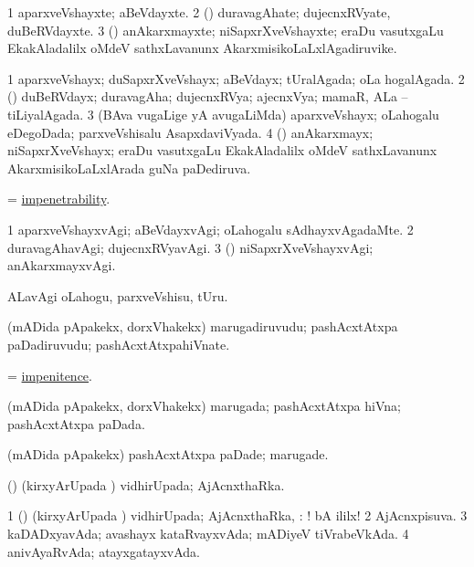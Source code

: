 \bentry
{}
\gl{\nA}
\bmng
\bnum
\num{1} aparxveVshayxte; aBeVdayxte. 
\num{2} (\rUpa) duravagAhate; dujecnxRVyate, duBeRVdayxte. 
\num{3} (\Bwvi) anAkarxmayxte; niSapxrXveVshayxte; eraDu vasutxgaLu EkakAladalilx oMdeV sathxLavanunx AkarxmisikoLaLxlAgadiruvike. 
\enum
\emng
\eentry

\bentry
{}
\gl{\gu}
\bmng
\bnum
\num{1} aparxveVshayx; duSapxrXveVshayx; aBeVdayx; tUralAgada; oLa hogalAgada. 
\num{2} (\rUpa) duBeRVdayx; duravagAha; dujecnxRVya; ajecnxVya; mamaR, ALa -- tiLiyalAgada. 
\num{3} (BAva \mo vugaLige yA avugaLiMda) aparxveVshayx; oLahogalu eDegoDada; parxveVshisalu AsapxdaviVyada. 
\num{4} (\Bwvi) anAkarxmayx; niSapxrXveVshayx; eraDu vasutxgaLu EkakAladalilx oMdeV sathxLavanunx AkarxmisikoLaLxlArada guNa paDediruva. 
\enum
\emng
\eentry

\bentry
{}
\gl{\nA}
\bmng
 = \hyperlink{impenetrability}{impenetrability}. 
\emng
\eentry

\bentry
{}
\gl{\kirxvi}
\bmng
\bnum
\num{1} aparxveVshayxvAgi; aBeVdayxvAgi; oLahogalu sAdhayxvAgadaMte. 
\num{2} duravagAhavAgi; dujecnxRVyavAgi. 
\num{3} (\Bwvi) niSapxrXveVshayxvAgi; anAkarxmayxvAgi. 
\enum
\emng
\eentry

\bentry
{}
\gl{\sakirx}
\bmng
ALavAgi oLahogu, parxveVshisu, tUru. 
\emng
\eentry

\bentry
{}
\gl{\nA}
\bmng
(mADida pApakekx, dorxVhakekx) marugadiruvudu; pashAcxtAtxpa paDadiruvudu; pashAcxtAtxpahiVnate. 
\emng
\eentry

\bentry
{}
\gl{\nA}
\bmng
 = \hyperlink{impenitence}{impenitence}. 
\emng
\eentry

\bentry
{}
\gl{\gu}
\bmng
(mADida pApakekx, dorxVhakekx) marugada; pashAcxtAtxpa hiVna; pashAcxtAtxpa paDada. 
\emng
\eentry

\bentry
{}
\gl{\kirxvi}
\bmng
(mADida pApakekx) pashAcxtAtxpa paDade; marugade. 
\emng
\eentry

\bentry
{}
\gl{\gu}
\bmng
(\vAyx) (kirxyArUpada \vi) vidhirUpada; AjAcnxthaRka. 
\emng
\eentry

\bentry
{}
\gl{\gu}
\bmng
\bnum
\num{1} (\vAyx) (kirxyArUpada \vi) vidhirUpada; AjAcnxthaRka, \udA: ! bA ililx! 
\num{2} AjAcnxpisuva. 
\num{3} kaDADxyavAda; avashayx kataRvayxvAda; mADiyeV tiVrabeVkAda. 
\num{4} anivAyaRvAda; atayxgatayxvAda. 
\enum
\emng
\eentry


